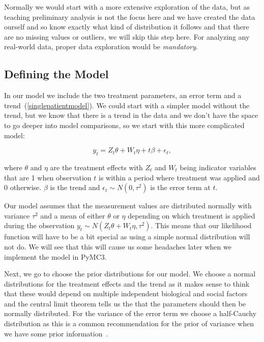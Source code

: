\documentclass[12pt,a4paper,leqno]{report}
\theoremstyle{plain}
\theoremstyle{definition}
\theoremstyle{remark}
\begin{document}
Normally we would start with a more extensive exploration of the data, but as teaching preliminary analysis
is not the focus here and we have created the data ourself and so know exactly what kind
of distribution it follows and that there are no missing values or outliers, we will
skip this step here. For analyzing any real-world data, proper data exploration would be \emph{mandatory}.

\subsection{Defining the Model}

In our model we include the two treatment parameters, an error term and a trend\ (\ref{singlepatientmodel}). We could
start with a simpler model without the trend, but we know that there is a trend in
the data and we don't have the space to go deeper into model comparisons, so we start
with this more complicated model:

\begin{def}\label{}
    \begin{equation}\label{singlepatientmodel}
        y_t = Z_t\theta + W_t\eta + t\beta + \epsilon_t,
    \end{equation}
\end{def}where \(\theta \) and \(\eta \) are the treatment effects with \(Z_t\) and \(W_t\) being indicator
variables that are 1 when observation \(t\) is within a period where treatment was applied and
0 otherwise. \(\beta \) is the trend and \(\epsilon_{t} \sim N(0,\tau^2) \) is the error term at \(t\).

Our model assumes that the measurement values are distributed normally with
variance \(\tau^2\) and a mean of either \(\theta \) or \(\eta \) depending on which
treatment is applied during the observation \(y_t \sim N(Z_t\theta + W_t\eta, \tau^2)\).
This means that our likelihood function will have to be a bit special as using a simple
normal distribution will not do. We will see that this will cause us some headaches
later when we implement the model in PyMC3.

Next, we go to choose the prior distributions for our model. We choose a
normal distributions for the treatment effects and the trend as it makes sense to think
that these would depend on multiple independent biological and social
factors and the central limit theorem tells us the that
the parameters should then be normally distributed. For the variance of the error
term we choose a half-Cauchy distribution as this is a common recommendation for the
prior of variance when we have some prior information\ \cite{variancepriors}.
\end{document}
